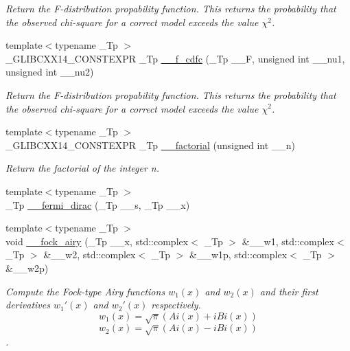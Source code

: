 \begin{DoxyCompactItemize}
\begin{DoxyCompactList}\small\item\em Return the F-\/distribution propability function. This returns the probability that the observed chi-\/square for a correct model exceeds the value $ \chi^2 $. \end{DoxyCompactList}\item 
{\footnotesize template$<$typename \+\_\+\+Tp $>$ }\\\+\_\+\+G\+L\+I\+B\+C\+X\+X14\+\_\+\+C\+O\+N\+S\+T\+E\+X\+P\+R \+\_\+\+Tp \hyperlink{namespacestd_1_1____detail_a0dd37941ab4f7d2ac376d59d62554c1f}{\+\_\+\+\_\+f\+\_\+cdfc} (\+\_\+\+Tp \+\_\+\+\_\+\+F, unsigned int \+\_\+\+\_\+nu1, unsigned int \+\_\+\+\_\+nu2)
\begin{DoxyCompactList}\small\item\em Return the F-\/distribution propability function. This returns the probability that the observed chi-\/square for a correct model exceeds the value $ \chi^2 $. \end{DoxyCompactList}\item 
{\footnotesize template$<$typename \+\_\+\+Tp $>$ }\\\+\_\+\+G\+L\+I\+B\+C\+X\+X14\+\_\+\+C\+O\+N\+S\+T\+E\+X\+P\+R \+\_\+\+Tp \hyperlink{namespacestd_1_1____detail_a8de5d6069cbef126684be0800f47f8b2}{\+\_\+\+\_\+factorial} (unsigned int \+\_\+\+\_\+n)
\begin{DoxyCompactList}\small\item\em Return the factorial of the integer n. \end{DoxyCompactList}\item 
{\footnotesize template$<$typename \+\_\+\+Tp $>$ }\\\+\_\+\+Tp \hyperlink{namespacestd_1_1____detail_a6057422cd4e359f44dcdb6cffc26128f}{\+\_\+\+\_\+fermi\+\_\+dirac} (\+\_\+\+Tp \+\_\+\+\_\+s, \+\_\+\+Tp \+\_\+\+\_\+x)
\item 
{\footnotesize template$<$typename \+\_\+\+Tp $>$ }\\void \hyperlink{namespacestd_1_1____detail_a96ccd15b0c375170be157136faa47387}{\+\_\+\+\_\+fock\+\_\+airy} (\+\_\+\+Tp \+\_\+\+\_\+x, std\+::complex$<$ \+\_\+\+Tp $>$ \&\+\_\+\+\_\+w1, std\+::complex$<$ \+\_\+\+Tp $>$ \&\+\_\+\+\_\+w2, std\+::complex$<$ \+\_\+\+Tp $>$ \&\+\_\+\+\_\+w1p, std\+::complex$<$ \+\_\+\+Tp $>$ \&\+\_\+\+\_\+w2p)
\begin{DoxyCompactList}\small\item\em Compute the Fock-\/type Airy functions $ w_1(x) $ and $ w_2(x) $ and their first derivatives $ w_1'(x) $ and $ w_2'(x) $ respectively. \[ w_1(x) = \sqrt{\pi}(Ai(x) + iBi(x)) \] \[ w_2(x) = \sqrt{\pi}(Ai(x) - iBi(x)) \]. \end{DoxyCompactList}\item 

\end{DoxyCompactItemize}
